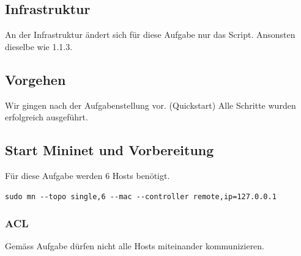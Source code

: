 \documentclass[a4,12pt]{scrartcl}
\begin{document}
\subsection{Infrastruktur}
An der Infrastruktur ändert sich für diese Aufgabe nur das Script. Ansonsten dieselbe wie 1.1.3.

\subsection{Vorgehen}
Wir gingen nach der Aufgabenstellung vor. (Quickstart) Alle Schritte wurden erfolgreich ausgeführt. 

\subsection{Start Mininet und Vorbereitung}
Für diese Aufgabe werden 6 Hosts benötigt. 
\begin{lstlisting}
sudo mn --topo single,6 --mac --controller remote,ip=127.0.0.1 
\end{lstlisting}

\subsubsection{ACL}
Gemäss Aufgabe dürfen nicht alle Hosts miteinander kommunizieren. 
\end{document}
